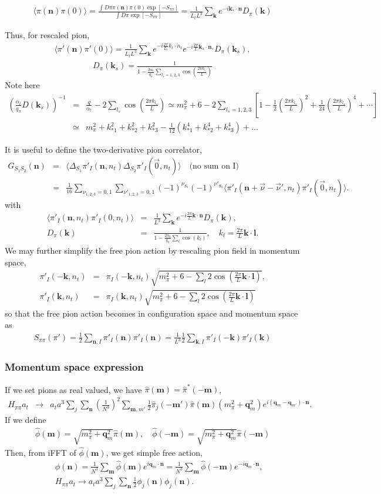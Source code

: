 \documentclass[10pt]{book}
\def\bm{\boldsymbol}
\newcommand{\bea}{\begin{eqnarray}}
\newcommand{\eea}{\end{eqnarray}}
\newcommand{\no}{\nonumber \\}
\def\vk{{\bm k}}
\def\vl{{\bm l}}
\def\vn{{\bm n}}
\def\la{\langle}
\def\ra{\rangle}
\begin{document}
\bea 
\la \pi(\vn)\pi(0)\ra=
\frac{\int D \pi  \pi(\vn)\pi(0) \exp[-S_{\pi\pi}] }{\int D \pi \exp[-S_{\pi\pi}]} 
=\frac{1}{L_t L^3} \sum_{\vk} e^{-i\vk_{*}\cdot\vn} D_\pi(\vk) 
\eea

Thus, for rescaled pion, 
\bea 
\la \pi'(\vn)\pi'(0)\ra=\frac{1}{L_t L^3}\sum_{\vk}e^{-i\frac{2\pi}{L_t} k_t\cdot n_t}
e^{-i\frac{2\pi}{L}\vk_s\cdot\vn_s} D_\pi(\vk_s),
\eea 
\bea 
D_\pi(\vk_s)=\frac{1}{1-\frac{2\alpha_t}{q_\pi}\sum_{l_s=1,2,3}\cos(\frac{2\pi k_{l_s}}{L})}
\eea 
Note here
\bea
(\frac{\alpha_t}{q_\pi}D(\vk_s))^{-1}
&=&\frac{q}{\alpha_t}-2\sum_{l_s}\cos(\frac{2\pi k_{l_s}}{L})
\simeq m_\pi^2+6 -2\sum_{l_s=1,2,3} \left[1-\frac{1}{2}(\frac{2\pi k_{l_s}}{L})^2
+\frac{1}{24}(\frac{2\pi k_{l_s}}{L})^4+\cdots \right] \no 
&\simeq& m_\pi^2+k_{*1}^2+k_{*2}^2+k_{*3}^2
-\frac{1}{12}(k_{*1}^4+k_{*2}^4+k_{*3}^4)+\dots 
\eea 

It is useful to define the two-derivative pion correlator,
\bea 
G_{S_1S_2}(\vn)&=&\la \Delta_{S_1} \pi'_I(\vn,n_t)\Delta_{S_2} \pi'_I({\vec 0},n_t)\ra 
\quad \mbox{(no sum on I) }\no 
&=& \frac{1}{16}\sum_{\nu_{1,2,3}=0,1}\sum_{\nu'_{1,2,3}=0,1}
(-1)^{\nu_{S_1}}(-1)^{\nu'_{S_2}}
\la \pi'_I(\vn+{\vec{\nu}}-{\vec{\nu}}', n_t) \pi'_I({\vec 0},n_t)\ra.
\eea 
with
\bea
\la \pi'_I(\vn,n_t)\pi'_I(0,n_t)\ra
&=&\frac{1}{L^3}\sum_{\vk} e^{-i\frac{2\pi}{L}\vk\cdot\vn} D_\pi(\vk), \no  
D_\pi(\vk)&=&\frac{1}{1-\frac{2\alpha_t}{q_\pi}\sum_{l} \cos(k_l)},
\quad k_l=\frac{2\pi}{L}\vk\cdot{\bm l}.
\eea 
We may further simplify the free pion action by rescaling pion field in momentum space,
\bea 
\pi'_I(-\vk,n_t)&=&\pi_I(-\vk,n_t)\sqrt{ m_\pi^2+6-\sum_{l}2\cos(\frac{2\pi}{L}\vk\cdot\vl)},\no 
\pi'_I(\vk,n_t)&=&\pi_I(\vk,n_t)\sqrt{ m_\pi^2+6-\sum_{l}2\cos(\frac{2\pi}{L}\vk\cdot\vl)} 
\eea 
so that the free pion action becomes in configuration space and momentum space as
\bea 
S_{\pi\pi}(\pi')=\frac{1}{2}\sum_{\vn,I} \pi'_I(\vn)\pi'_I(\vn)
=\frac{1}{L^3}\frac{1}{2}\sum_{\vk,I} \pi'_I(-\vk)\pi'_I(\vk)
\eea 

\subsubsection{Momentum space expression} 
If we set pions as real valued, we have $\hat{\pi}({\bm m})=\hat{\pi}^*(-{\bm m})$, 
\bea 
H_{\pi\pi}a_t
&\to& a_t a^3 \sum_{j}\sum_{\bm n} (\frac{1}{N^3})^2\sum_{\bm m,m'}
  \frac{1}{2}\hat{\pi}_j(-{\bm m'})\hat{\pi}({\bm m}) (m_\pi^2+{\bm q}_m^2)
   e^{i({\bm q}_{m}-{\bm q}_{m'})\cdot{\bm n}}.
\eea 
If we define
\bea 
\hat{\phi}({\bm m})=\sqrt{m_\pi^2+{\bm q}_m^2}\hat{\pi}({\bm m}),\quad 
\hat{\phi}(-{\bm m})=\sqrt{m_\pi^2+{\bm q}_m^2}\hat{\pi}(-{\bm m})
\eea 
Then, from iFFT of $\hat{\phi}({\bm m})$, we get simple free action,
\bea 
& &{\phi}({\bm n})=\frac{1}{N^3}\sum_{\bm m} \hat{\phi}({\bm m})e^{i{\bm q}_m\cdot{\bm n}}
               =\frac{1}{N^3}\sum_{\bm m} \hat{\phi}(-{\bm m})e^{-i{\bm q}_m\cdot{\bm n}} ,\no 
& &H_{\pi\pi}a_t\to a_t a^3 \sum_{j}\sum_{\bm n} \frac{1}{2}\phi_j({\bm n})\phi_j({\bm n}).
\eea 
\end{document}
